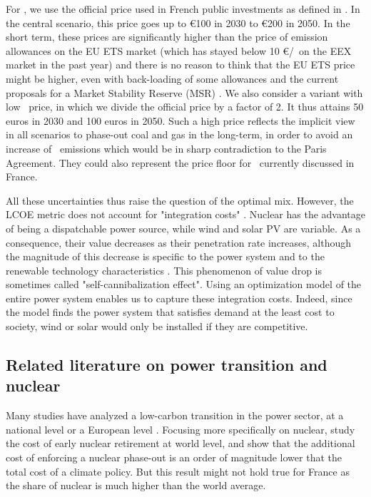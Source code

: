 For \coo, we use the official price used in French public investments as defined in \cite{Quinet2009}. In the central scenario, this price goes up to \euro 100 in 2030 to \euro 200 in 2050. In the short term, these prices are significantly higher than the price of emission allowances on the EU ETS market (which has stayed below 10 \euro/\coo\ on the EEX market in the past year) and there is no reason to think that the EU ETS price might be higher, even with back-loading of some allowances and the current proposals for a Market Stability Reserve (MSR) \citep{Lecuyer2016}. 
We also consider a variant with low \coo\ price, in which we divide the official price by a factor of 2. 
It thus attains 50 euros in 2030 and 100 euros in 2050. Such a high price reflects the implicit view in all scenarios to phase-out coal and gas in the long-term, in order to avoid an increase of \coo\ emissions which would be in sharp contradiction to the Paris Agreement. They could also represent the price floor for \coo\ currently discussed in France. 

All these uncertainties thus raise the question of the optimal mix. However, the LCOE metric does not account for "integration costs" \citep{Ueckerdt2013}. 
Nuclear has the advantage of being a dispatchable power source, while wind and solar PV are variable. As a consequence, their value decreases as their penetration rate increases, although the magnitude of this decrease is specific to the power system \citep{Hirth2016a} and to the renewable technology characteristics \citep{Hirth2016}. This phenomenon of value drop is sometimes called "self-cannibalization effect". Using an optimization model of the entire power system enables us to capture these integration costs. Indeed, since the model finds the power system that satisfies demand at the least cost to society, wind or solar would only be installed if they are competitive.


\subsection{Related literature on power transition and nuclear}

Many studies have analyzed a low-carbon transition in the power sector, at a national level \citep{Fraunhofer2015} or a European level \citep{Jagemann2013, EuropeanCommission2012}. 
Focusing more specifically on nuclear, \citet{Bauer2012} study the cost of early nuclear retirement at world level, and show that the additional cost of enforcing a nuclear phase-out is an order of magnitude lower that the total cost of a climate policy. But this result might not hold true for France as the share of nuclear is much higher than the world average.

